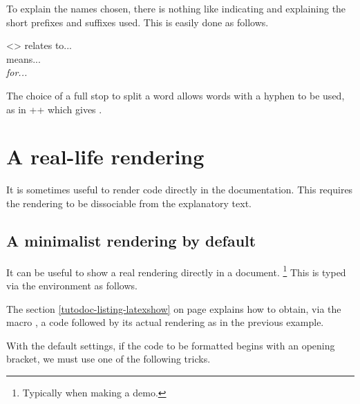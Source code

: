 To explain the names chosen, there is nothing like indicating and explaining the short prefixes and suffixes used. This is easily done as follows.


\begin{tdoclatex}<>
 relates to...      \\
 means...   \\
\emph{ for...}
\end{tdoclatex}


\begin{tdocrem}
    The choice of a full stop to split a word allows words with a hyphen to be used, as in \tdoclatexin++ which gives .
\end{tdocrem}


\section{A real-life rendering}
\label{tutodoc-showcase}

It is sometimes useful to render code directly in the documentation. This requires the rendering to be dissociable from the explanatory text.



\subsection{A minimalist rendering by default}

\begin{tdocexa}
    It can be useful to show a real rendering directly in a document.%
    \footnote{
        Typically when making a demo.
    }
    This is typed via the environment  as follows.

\end{tdocexa}


\begin{tdocrem}
    The section \ref{tutodoc-listing-latexshow} on page \pageref{tutodoc-listing-latexshow} explains how to obtain, via the macro , a code followed by its actual rendering as in the previous example.
\end{tdocrem}


\begin{tdocwarn}
    With the default settings, if the code to be formatted begins with an opening bracket, we must use one of the following tricks.

\end{tdocwarn}


